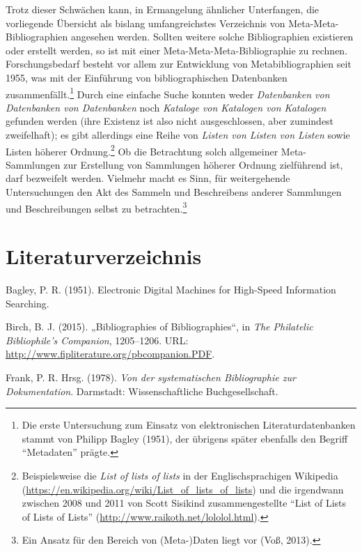 \documentclass[a4paper,
fontsize=11pt,
oneside,
numbers=noperiodatend,
parskip=half-,
bibliography=totoc,
final
]{scrartcl}
\begin{document}
Trotz dieser Schwächen kann, in Ermangelung ähnlicher Unterfangen, die
vorliegende Übersicht als bislang umfangreichstes Verzeichnis von
Meta-Meta- Bibliographien angesehen werden. Sollten weitere solche
Bibliographien existieren oder erstellt werden, so ist mit einer
Meta-Meta-Meta-Bibliographie zu rechnen. Forschungsbedarf besteht vor
allem zur Entwicklung von Metabibliographien seit 1955, was mit der
Einführung von bibliographischen Datenbanken zusammenfällt.\footnote{Die
  erste Untersuchung zum Einsatz von elektronischen Literaturdatenbanken
  stammt von Philipp Bagley (1951), der übrigens später ebenfalls den
  Begriff \enquote{Metadaten} prägte.} Durch eine einfache Suche konnten
weder \emph{Datenbanken von Datenbanken von Datenbanken} noch
\emph{Kataloge von Katalogen von Katalogen} gefunden werden (ihre
Existenz ist also nicht ausgeschlossen, aber zumindest zweifelhaft); es
gibt allerdings eine Reihe von \emph{Listen von Listen von Listen} sowie
Listen höherer Ordnung.\footnote{Beispielsweise die \emph{List of lists
  of lists} in der Englischsprachigen Wikipedia
  (\url{https://en.wikipedia.org/wiki/List_of_lists_of_lists}) und die
  irgendwann zwischen 2008 und 2011 von Scott Sisikind zusammengestellte
  \enquote{List of Lists of Lists of Lists}
  (\url{http://www.raikoth.net/lololol.html}).} Ob die Betrachtung solch
allgemeiner Meta-Sammlungen zur Erstellung von Sammlungen höherer
Ordnung zielführend ist, darf bezweifelt werden. Vielmehr macht es Sinn,
für weitergehende Untersuchungen den Akt des Sammeln und Beschreibens
anderer Sammlungen und Beschreibungen selbst zu betrachten.\footnote{Ein
  Ansatz für den Bereich von (Meta-)Daten liegt vor (Voß, 2013).}

\section*{Literaturverzeichnis}\label{literaturverzeichnis}

Bagley, P. R. (1951). Electronic Digital Machines for High-Speed
Information Searching.

Birch, B. J. (2015). „Bibliographies of Bibliographies``, in \emph{The
Philatelic Bibliophile's Companion}, 1205--1206. URL:
\url{http://www.fipliterature.org/pbcompanion.PDF}.

Frank, P. R. Hrsg. (1978). \emph{Von der systematischen Bibliographie
zur Dokumentation}. Darmstadt: Wissenschaftliche Buchgesellschaft.
\end{document}
